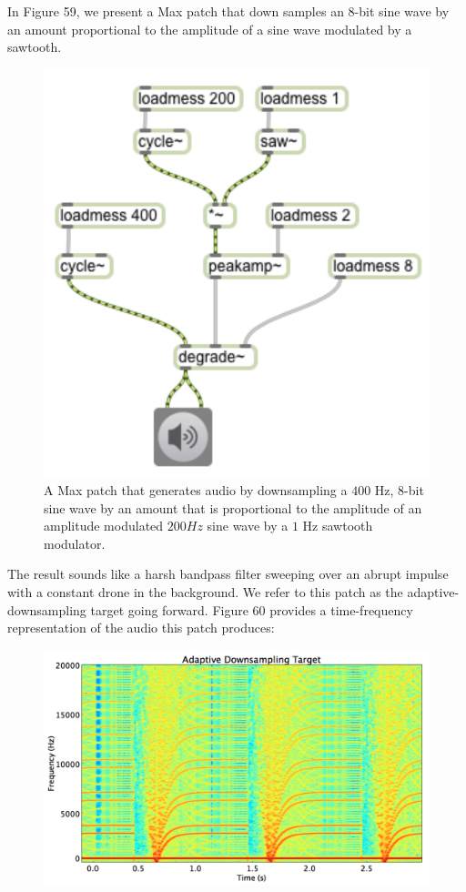 \documentclass[12pt]{report} 	%
\numberwithin{figure}{chapter}
\numberwithin{table}{chapter}
\numberwithin{equation}{chapter}
\begin{document}
\begin{flushleft}
In Figure 59, we present a Max patch that down samples an 8-bit sine wave by an amount proportional to the amplitude of a sine wave modulated by a sawtooth. 
\begin{figure}[h!]
\begin{center}
\includegraphics[scale=0.8]{AdaptiveDegrade}
\caption[Adaptive downsampling Max patch]{A Max patch that generates audio by downsampling a $400$ Hz, $8$-bit sine wave by an amount that is proportional to the amplitude of an amplitude modulated $200 Hz$ sine wave by a $1$ Hz sawtooth modulator.}
\end{center}
\end{figure}
The result sounds like a harsh bandpass filter sweeping over an abrupt impulse with a constant drone in the background. We refer to this patch as the adaptive-downsampling target going forward. Figure 60 provides a time-frequency representation of the audio this patch produces:
\begin{figure}[h!]
\begin{center}
\includegraphics[width=\linewidth]{AdaptiveDownsamplingTargetSTFT}

\end{center}
\end{figure}
\end{flushleft}
\end{document}
